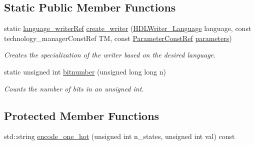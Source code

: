 \subsection*{Static Public Member Functions}
\begin{DoxyCompactItemize}
\item 
static \hyperlink{language__writer_8hpp_ab5bb59a651cbff3f3c83b0f51c0b0b71}{language\+\_\+writer\+Ref} \hyperlink{classlanguage__writer_ae0ae8fbdc6d0a7e8a22b4344672c45ef}{create\+\_\+writer} (\hyperlink{language__writer_8hpp_a890069761ca3ce361c42684c789d886c}{H\+D\+L\+Writer\+\_\+\+Language} language, const technology\+\_\+manager\+Const\+Ref TM, const \hyperlink{Parameter_8hpp_a37841774a6fcb479b597fdf8955eb4ea}{Parameter\+Const\+Ref} \hyperlink{classlanguage__writer_aeb717c1d12571e3808759009be752d59}{parameters})
\begin{DoxyCompactList}\small\item\em Creates the specialization of the writer based on the desired language. \end{DoxyCompactList}\item 
static unsigned int \hyperlink{classlanguage__writer_a966840e95ec2f66d5128d6cbc54b89bb}{bitnumber} (unsigned long long n)
\begin{DoxyCompactList}\small\item\em Counts the number of bits in an unsigned int. \end{DoxyCompactList}\end{DoxyCompactItemize}
\subsection*{Protected Member Functions}
\begin{DoxyCompactItemize}
\item 
std\+::string \hyperlink{classlanguage__writer_a076458c3656ec8f405db0dbf55889f69}{encode\+\_\+one\+\_\+hot} (unsigned int n\+\_\+states, unsigned int val) const
\end{DoxyCompactItemize}
